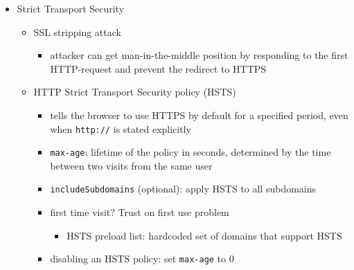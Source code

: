 \documentclass[12pt,titlepage,a4paper]{report}
\begin{document}
\begin{itemize}
		\item Strict Transport Security
		\begin{itemize}
			\item SSL stripping attack
			\begin{itemize}
				\item attacker can get man-in-the-middle position by responding to the first HTTP-request and prevent the redirect to HTTPS
			\end{itemize}
		
			\item HTTP Strict Transport Security policy (HSTS)
			\begin{itemize}
				\item tells the browser to use HTTPS by default for a specified period, even when \texttt{http://} is stated explicitly
				\item \texttt{max-age}: lifetime of the policy in seconds, determined by the time between two visits from the same user
				\item \texttt{includeSubdomains} (optional): apply HSTS to all subdomains
				\item first time visit? Trust on first use problem
				\begin{itemize}
					\item HSTS preload list: hardcoded set of domains that support HSTS
				\end{itemize}
				\item disabling an HSTS policy: set \texttt{max-age} to 0
			\end{itemize}
		\end{itemize}
	\end{itemize}
\end{document}
